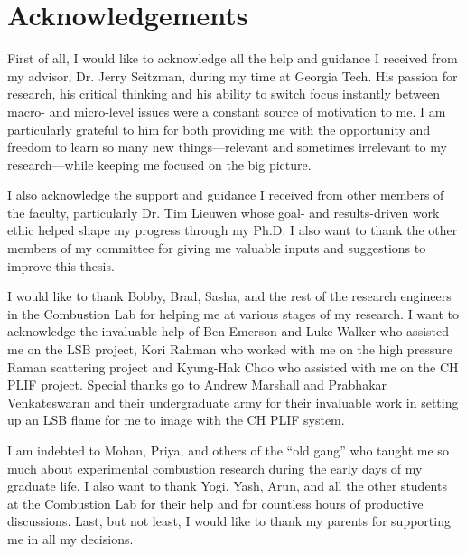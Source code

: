 \chapter*{Acknowledgements}

First of all, I would like to acknowledge all the help and guidance I received from my advisor, Dr. Jerry Seitzman, during my time at Georgia Tech.
His passion for research, his critical thinking and his ability to switch focus instantly between macro- and micro-level issues were a constant source of motivation to me.
I am particularly grateful to him for both providing me with the opportunity and freedom to learn so many new things---relevant and sometimes irrelevant to my research---while keeping me focused on the big picture.

I also acknowledge the support and guidance I received from other members of the faculty, particularly Dr. Tim Lieuwen whose goal- and results-driven work ethic helped shape my progress through my Ph.D.
I also want to thank the other members of my committee for giving me valuable inputs and suggestions to improve this thesis.

I would like to thank Bobby, Brad, Sasha, and the rest of the research engineers in the Combustion Lab for helping me at various stages of my research.
I want to acknowledge the invaluable help of Ben Emerson and Luke Walker who assisted me on the LSB project, Kori Rahman who worked with me on the high pressure Raman scattering project and Kyung-Hak Choo who assisted with me on the CH PLIF project.
Special thanks go to Andrew Marshall and Prabhakar Venkateswaran and their undergraduate army for their invaluable work in setting up an LSB flame for me to image with the CH PLIF system.

I am indebted to Mohan, Priya, and others of the ``old gang'' who taught me so much about experimental combustion research during the early days of my graduate life.
I also want to thank Yogi, Yash, Arun, and all the other students at the Combustion Lab for their help and for countless hours of productive discussions.
Last, but not least, I would like to thank my parents for supporting me in all my decisions.

